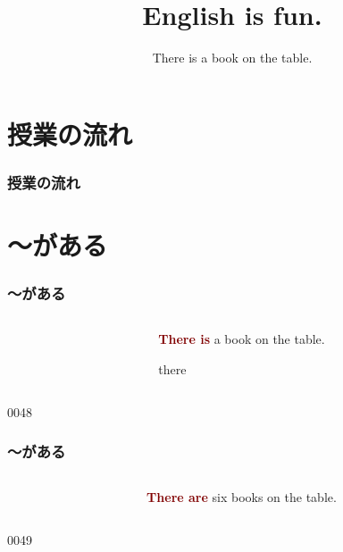 \documentclass[aspectratio=169,xcolor={dvipsnames,table}]{beamer}
\title{English is fun.}
\subtitle{There is a book on the table.}
\author{}
\institute[]{}
\date[]
\newcommand{\myaudio}[1]{\href{#1}{\faVolumeUp}}
\begin{document}
\begin{frame}[plain]
  \titlepage
\end{frame}

\section*{授業の流れ}
\begin{frame}[plain]
  \frametitle{授業の流れ}
  \tableofcontents
\end{frame}

\section{〜がある}

\begin{frame}[plain]\frametitle{〜がある}
\begin{columns}[T]
\begin{column}{.4\textwidth}
\end{column}\pause
\begin{column}{.55\textwidth}\LARGE
\textcolor{Maroon}{\bfseries There is} a book on the table.

\hfill{\small there }
\end{column}
\end{columns}
\vfill
\mbox{}\hfill{\tiny 0048}\,{\scriptsize \myaudio{./audio/001_there_is_01.mp3}}

\end{frame}
\begin{frame}[plain]\frametitle{〜がある}
\begin{columns}
\begin{column}{.3\textwidth}
\end{column}\pause
\begin{column}{.65\textwidth}\LARGE
\textcolor{Maroon}{\bfseries There are} six books on the table.
\end{column}
\end{columns}
\vfill
\mbox{}\hfill{\tiny 0049}\,{\scriptsize \myaudio{./audio/001_there_is_02.mp3}}
\end{frame}
\end{document}

